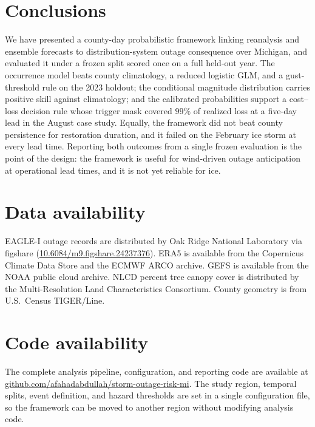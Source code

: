 \documentclass[10pt,twocolumn,letterpaper]{article}
\begin{document}
\section{Conclusions}

We have presented a county-day probabilistic framework linking reanalysis and
ensemble forecasts to distribution-system outage consequence over Michigan, and
evaluated it under a frozen split scored once on a full held-out year. The
occurrence model beats county climatology, a reduced logistic GLM, and a
gust-threshold rule on the 2023 holdout; the conditional magnitude distribution
carries positive skill against climatology; and the calibrated probabilities
support a cost--loss decision rule whose trigger mask covered $99\%$ of realized
loss at a five-day lead in the August case study. Equally, the framework did not
beat county persistence for restoration duration, and it failed on the February
ice storm at every lead time. Reporting both outcomes from a single frozen
evaluation is the point of the design: the framework is useful for wind-driven
outage anticipation at operational lead times, and it is not yet reliable for
ice.

\section*{Data availability}

EAGLE-I outage records are distributed by Oak Ridge National Laboratory
\citep{brelsford2024eaglei} via figshare
(\href{https://doi.org/10.6084/m9.figshare.24237376}{10.6084/m9.figshare.24237376}).
ERA5 is available from the Copernicus Climate Data Store and the ECMWF ARCO
archive. GEFS is available from the NOAA public cloud archive. NLCD percent tree
canopy cover is distributed by the Multi-Resolution Land Characteristics
Consortium. County geometry is from U.S.\ Census TIGER/Line.

\section*{Code availability}

The complete analysis pipeline, configuration, and reporting code are available
at
\href{https://github.com/afahadabdullah/storm-outage-risk-mi}{github.com/afahadabdullah/storm-outage-risk-mi}.
The study region, temporal splits, event definition, and hazard thresholds are
set in a single configuration file, so the framework can be moved to another
region without modifying analysis code.
\end{document}
